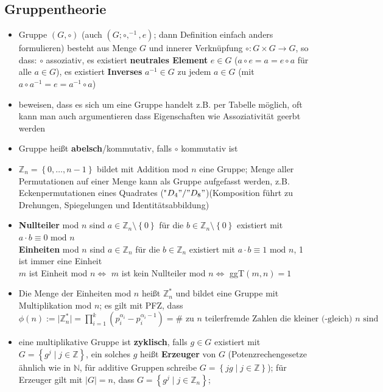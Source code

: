 \documentclass[10pt,a4paper]{article}
\begin{document}
\subsection{Gruppentheorie}
\begin{itemize}
\item Gruppe $(G,\circ)$ (auch $(G;\circ,^{-1},e)$; dann Definition einfach anders formulieren) besteht aus Menge $G$ und innerer Verknüpfung $\circ:G\times G\rightarrow G$, so dass: $\circ$ assoziativ, es existiert  \textbf{neutrales Element} $e\in G$ ($a\circ e=a=e\circ a$ für alle $a\in G$), es existiert \textbf{Inverses} $a^{-1}\in G$ zu jedem $a\in G$ (mit $a\circ a^{-1}=e=a^{-1}\circ a$)
\item beweisen, dass es sich um eine Gruppe handelt z.B. per Tabelle möglich, oft kann man auch argumentieren dass Eigenschaften wie Assoziativität geerbt werden
\item Gruppe heißt \textbf{abelsch}/kommutativ, falls $\circ$ kommutativ ist
\item $\mathbb{Z}_{n}=\left\lbrace 0,\dotsc,n-1\right\rbrace $ bildet mit Addition mod $n$ eine Gruppe; Menge aller Permutationen auf einer Menge kann als Gruppe aufgefasst werden, z.B. Eckenpermutationen eines Quadrates ("$D_4"/"D_{8}"$)(Komposition führt zu Drehungen, Spiegelungen und Identitätsabbildung)
\item \textbf{Nullteiler} mod $n$ sind $a\in \mathbb{Z}_{n}\setminus \left\lbrace 0\right\rbrace$ für die $b\in \mathbb{Z}_{n}\setminus \left\lbrace 0\right\rbrace$ existiert mit $a\cdot b\equiv 0 \text{ mod } n$\\
\textbf{Einheiten} mod $n$ sind $a\in \mathbb{Z}_{n}$ für die $b\in \mathbb{Z}_{n}$ existiert mit $a\cdot b\equiv 1 \text{ mod } n$, 1 ist immer eine Einheit\\
$m$ ist Einheit mod $n\Leftrightarrow$ $m$ ist kein Nullteiler mod $n\Leftrightarrow$ ggT$(m,n)=1$
\item Die Menge der Einheiten mod $n$ heißt $\mathbb{Z}_{n}^{*}$ und bildet eine Gruppe mit Multiplikation mod $n$; es gilt mit PFZ, dass $\phi(n):=\vert \mathbb{Z}_{n}^{*}\vert=\prod_{i=1}^{k}(p_{i}^{\alpha_{i}}-p_{i}^{\alpha_{i}-1})=\# \text{ zu } n \text{ teilerfremde Zahlen die kleiner (-gleich) }n \text{ sind}$
\item eine multiplikative Gruppe ist \textbf{zyklisch}, falls $g\in G$ existiert mit $G=\left\lbrace g^{j}\mid j \in \mathbb{Z}\right\rbrace$, ein solches $g$ heißt \textbf{Erzeuger} von $G$ (Potenzrechengesetze ähnlich wie in $\mathbb{N}$, für additive Gruppen schreibe $G=\left\lbrace jg\mid j \in \mathbb{Z}\right\rbrace$); für Erzeuger gilt mit $\vert G\vert=n$, dass $G=\left\lbrace g^{j}\mid j \in \mathbb{Z}_{n}\right\rbrace;$

\end{itemize}
\end{document}

